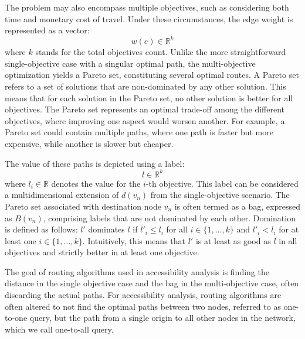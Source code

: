 The problem may also encompass multiple objectives, such as considering both time and monetary cost of travel.
Under these circumstances, the edge weight is represented as a vector:
\[ w(e) \in \mathbb{R}^k \]
where \( k \) stands for the total objectives count.
Unlike the more straightforward single-objective case with a singular optimal path, the multi-objective optimization yields a Pareto set, constituting several optimal routes.
A Pareto set refers to a set of solutions that are non-dominated by any other solution.
This means that for each solution in the Pareto set, no other solution is better for all objectives.
The Pareto set represents an optimal trade-off among the different objectives, where improving one aspect would worsen another.
For example, a Pareto set could contain multiple paths, where one path is faster but more expensive, while another is slower but cheaper.

The value of these paths is depicted using a label:
\[ l \in \mathbb{R}^k \]
where \( l_i \in \mathbb{R} \) denotes the value for the \( i \)-th objective.
This label can be considered a multidimensional extension of \( d(v_n) \) from the single-objective scenario.
The Pareto set associated with destination node \( v_n \) is often termed as a bag, expressed as \( B(v_n) \), comprising labels that are not dominated by each other.
Domination is defined as follows: \( l' \) dominates \( l \) if \( l'_i \leq l_i \) for all \( i \in \{1, \dots, k\} \) and \( l'_i < l_i \) for at least one \( i \in \{1, \dots, k\} \).
Intuitively, this means that \(l' \) is at least as good as \( l \) in all objectives and strictly better in at least one objective.

The goal of routing algorithms used in accessibility analysis is finding the distance in the single objective case and the bag in the multi-objective case, often discarding the actual paths.
For accessibility analysis, routing algorithms are often altered to not find the optimal paths between two nodes, referred to as one-to-one query, but the path from a single origin to all other nodes in the network, which we call one-to-all query.

